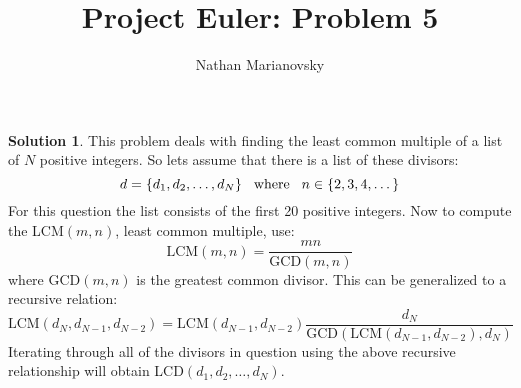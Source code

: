 \documentclass[12pt, letterpaper, onecolumn, conference, final]{IEEEtran}
\title{Project Euler: Problem 5}
\author{Nathan Marianovsky}
\theoremstyle{definition}
\newtheorem*{problem*}{Problem}
\newtheorem*{solution*}{Solution}
\theoremstyle{plain}
\begin{document}
\maketitle

\begin{center}
\end{center}

\vspace{.3cm}
\begin{solution*}
This problem deals with finding the least common multiple of a list of $N$ positive integers. So lets assume that there is a list of these divisors:
\begin{equation*}
d = \{d_1,d_2,\dots,d_N\} \hspace{.3cm} \text{where} \hspace{.3cm} n \in \{2,3,4,\dots\}
\end{equation*}
For this question the list consists of the first 20 positive integers. Now to compute the LCM$(m,n)$, least common multiple, use:
\begin{equation*}
\text{LCM}(m,n) = \frac{mn}{\text{GCD}(m,n)}
\end{equation*}
where GCD$(m,n)$ is the greatest common divisor. This can be generalized to a recursive relation:
\begin{equation*}
\text{LCM}(d_N,d_{N-1},d_{N-2}) = \text{LCM}(d_{N-1},d_{N-2}) \frac{d_N}{\text{GCD}(\text{LCM}(d_{N-1},d_{N-2}),d_N)}
\end{equation*}
Iterating through all of the divisors in question using the above recursive relationship will obtain LCD$(d_1,d_2,\dots,d_N)$.
\end{solution*}
\end{document}
